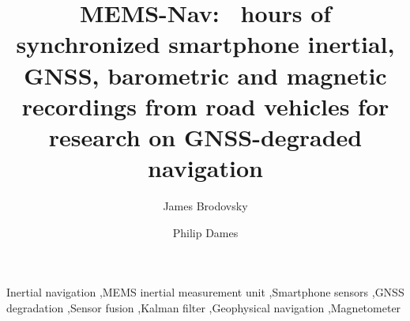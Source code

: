 \documentclass[preprint,12pt,authoryear]{elsarticle}
\begin{document}
\begin{frontmatter}

\title{MEMS-Nav: \numTotalHours\texorpdfstring{~}{ }hours of synchronized smartphone inertial, GNSS, barometric and magnetic recordings from road vehicles for research on GNSS-degraded navigation}

\author[tu]{James Brodovsky}
\author[tu]{Philip Dames}

\begin{abstract}

\end{abstract}

\begin{keyword}
Inertial navigation \sep MEMS inertial measurement unit \sep Smartphone sensors \sep GNSS degradation \sep Sensor fusion \sep Kalman filter \sep Geophysical navigation \sep Magnetometer
\end{keyword}

\end{frontmatter}











\end{document}
